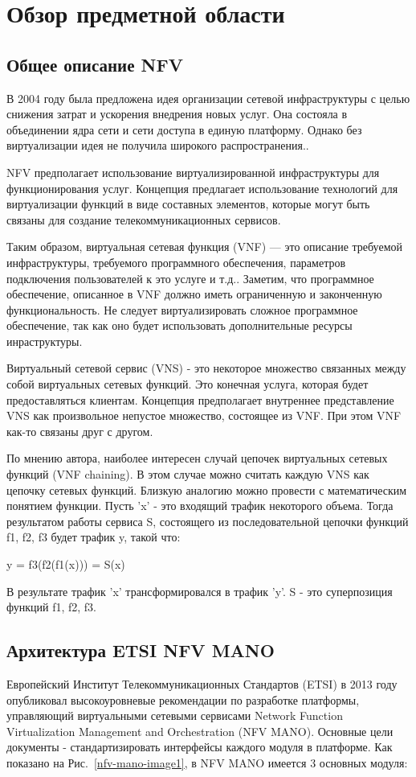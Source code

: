 \documentclass[oneside,final,14pt,a4paper]{extreport}
\begin{document}
\chapter{Обзор предметной области}
\section{Общее описание NFV}
В 2004 году была предложена идея организации сетевой инфраструктуры с целью снижения затрат и ускорения внедрения новых услуг. Она состояла в объединении ядра сети и сети доступа в единую платформу. Однако без виртуализации идея не получила широкого распространения.\cite{nfv-state2}.

NFV предполагает использование виртуализированной инфраструктуры для функционирования услуг. Концепция предлагает использование технологий для виртуализации функций в виде составных элементов, которые могут быть связаны для создание телекоммуникационных сервисов. 

Таким образом, виртуальная сетевая функция (VNF) --- это описание требуемой инфраструктуры, требуемого программного обеспечения, параметров подключения пользователей к это услуге и т.д.. Заметим, что программное обеспечение, описанное в VNF должно иметь ограниченную и законченную функциональность. Не следует виртуализировать сложное программное обеспечение, так как оно будет использовать дополнительные ресурсы инраструктуры.

Виртуальный сетевой сервис (VNS) - это некоторое множество связанных между собой виртуальных сетевых функций. Это конечная услуга, которая будет предоставляться клиентам. Концепция предполагает внутреннее представление VNS как произвольное непустое множество, состоящее из VNF. При этом VNF как-то связаны друг с другом.

По мнению автора, наиболее интересен случай цепочек виртуальных сетевых функций (VNF chaining). В этом случае можно считать каждую VNS как цепочку сетевых функций. Близкую аналогию можно провести с математическим понятием функции. Пусть 'x' - это входящий трафик некоторого объема. Тогда результатом работы сервиса S, состоящего из последовательной цепочки функций f1, f2, f3 будет трафик y, такой что:

y = f3(f2(f1(x))) = S(x)

В результате трафик 'x' трансформировался в трафик 'y'. S - это суперпозиция функций f1, f2, f3.


\section{Архитектура ETSI NFV MANO}
Европейский Институт Телекоммуникационных Стандартов (ETSI) в 2013 году опубликовал высокоуровневые рекомендации по разработке платформы, управляющий виртуальными сетевыми сервисами Network Function Virtualization Management and Orchestration (NFV MANO). Основные цели документы - стандартизировать интерфейсы каждого модуля в платформе.\cite{nfv-mano-state1} Как показано на Рис.~\ref{nfv-mano-image1}, в NFV MANO имеется 3 основных модуля:
\end{document}
